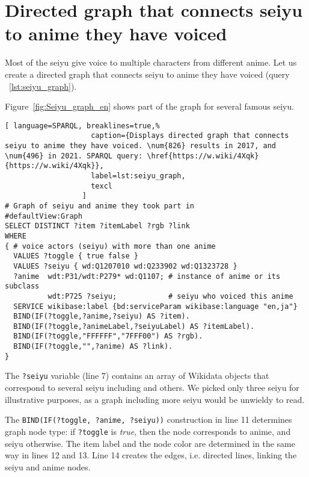 \section{Directed graph that connects seiyu to anime they have voiced}

Most of the seiyu give voice to multiple characters from different anime. Let us create a directed graph that connects seiyu to anime they have voiced (query ~\ref{lst:seiyu_graph}).

Figure~\ref{fig:Seiyu_graph_en} shows part of the graph for several famous seiyu.

\begin{lstlisting}[ language=SPARQL, breaklines=true,%
                    caption={Displays directed graph that connects seiyu to anime they have voiced. \num{826} results in 2017, and \num{496} in 2021. SPARQL query: \href{https://w.wiki/4Xqk}{https://w.wiki/4Xqk}},
                    label=lst:seiyu_graph,
                    texcl
                  ]
# Graph of seiyu and anime they took part in
#defaultView:Graph
SELECT DISTINCT ?item ?itemLabel ?rgb ?link
WHERE
{ # voice actors (seiyu) with more than one anime
  VALUES ?toggle { true false }
  VALUES ?seiyu { wd:Q1207010 wd:Q233902 wd:Q1323728 }
  ?anime  wdt:P31/wdt:P279* wd:Q1107; # instance of anime or its subclass
          wdt:P725 ?seiyu;            # seiyu who voiced this anime 
  SERVICE wikibase:label {bd:serviceParam wikibase:language "en,ja"}
  BIND(IF(?toggle,?anime,?seiyu) AS ?item).
  BIND(IF(?toggle,?animeLabel,?seiyuLabel) AS ?itemLabel).
  BIND(IF(?toggle,"FFFFFF","7FFF00") AS ?rgb).
  BIND(IF(?toggle,"",?anime) AS ?link).
}
\end{lstlisting}%

The \lstinline|?seiyu| variable (line 7) contains an array of Wikidata objects that correspond to several seiyu including  and others. We picked only three seiyu for illustrative purposes, as a graph including more seiyu would be unwieldy to read.

The \lstinline|BIND(IF(?toggle, ?anime, ?seiyu))| 
construction in line \num{11} determines graph node type: if \lstinline|?toggle| is \emph{true}, 
then the node corresponds to anime, and seiyu otherwise. 
The item label and the node color are determined in the same way in lines \num{12} and \num{13}. 
Line \num{14} creates the edges, i.e. directed lines, linking the seiyu and anime nodes.


